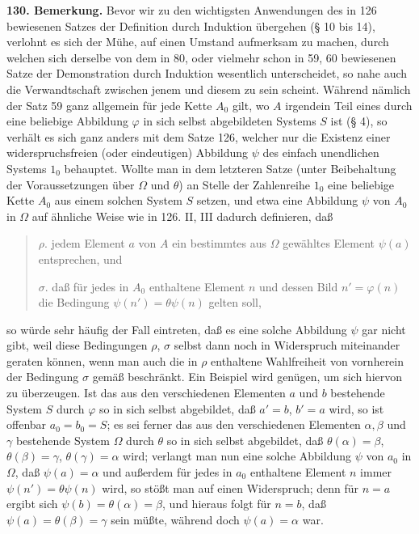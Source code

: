 \documentclass[11pt]{article}
\begin{document}
\noindent\textbf{130. Bemerkung.} Bevor wir zu den wichtigsten Anwendungen des in 126 bewiesenen Satzes der Definition durch Induktion übergehen (\S{} 10 bis 14), verlohnt es sich der Mühe, auf einen Umstand aufmerksam zu machen, durch welchen sich derselbe von dem in 80, oder vielmehr schon in 59, 60 bewiesenen Satze der Demonstration durch Induktion wesentlich unterscheidet, so nahe auch die Verwandtschaft zwischen jenem und diesem zu sein scheint. Während nämlich der Satz 59 ganz allgemein für jede Kette $A_0$ gilt, wo $A$ irgendein Teil eines durch eine beliebige Abbildung $\varphi$ in sich selbst abgebildeten Systems $S$ ist (\S{} 4), so verhält es sich ganz anders mit dem Satze 126, welcher nur die Existenz einer widerspruchsfreien (oder eindeutigen) Abbildung $\psi$ des einfach unendlichen Systems $1_0$ behauptet. Wollte man in dem letzteren Satze (unter Beibehaltung der Voraussetzungen über $\Omega$ und $\theta$) an Stelle der Zahlenreihe $1_0$ eine beliebige Kette $A_0$ aus einem solchen System $S$ setzen, und etwa eine Abbildung $\psi$ von $A_0$ in $\Omega$ auf ähnliche Weise wie in 126. II, III dadurch definieren, daß
\begin{quote}
$\rho.$ jedem Element $a$ von $A$ ein bestimmtes aus $\Omega$ gewähltes Element $\psi(a)$ entsprechen, und

$\sigma.$ daß für jedes in $A_0$ enthaltene Element $n$ und dessen Bild $n'=\varphi(n)$ die Bedingung $\psi(n')=\theta\psi(n)$ gelten soll,
\end{quote}
so würde sehr häufig der Fall eintreten, daß es eine solche Abbildung $\psi$ gar nicht gibt, weil diese Bedingungen $\rho$, $\sigma$ selbst dann noch in Widerspruch miteinander geraten können, wenn man auch die in $\rho$ enthaltene Wahlfreiheit von vornherein der Bedingung $\sigma$ gemäß beschränkt. Ein Beispiel wird genügen, um sich hiervon zu überzeugen. Ist das aus den verschiedenen Elementen $a$ und $b$ bestehende System $S$ durch $\varphi$ so in sich selbst abgebildet, daß $a'=b$, $b'=a$ wird, so ist offenbar $a_0=b_0=S$; es sei ferner das aus den verschiedenen Elementen $\alpha,\beta$ und $\gamma$ bestehende System $\Omega$ durch $\theta$ so in sich selbst abgebildet, daß $\theta(\alpha)=\beta$, $\theta(\beta)=\gamma$, $\theta(\gamma)=\alpha$ wird; verlangt man nun eine solche Abbildung $\psi$ von $a_0$ in $\Omega$, daß $\psi(a)=\alpha$ und außerdem für jedes in $a_0$ enthaltene Element $n$ immer $\psi(n')=\theta\psi(n)$ wird, so stößt man auf einen Widerspruch; denn für $n=a$ ergibt sich $\psi(b)=\theta(\alpha)=\beta$, und hieraus folgt für $n=b$, daß $\psi(a)=\theta(\beta)=\gamma$ sein müßte, während doch $\psi(a)=\alpha$ war.
\end{document}
